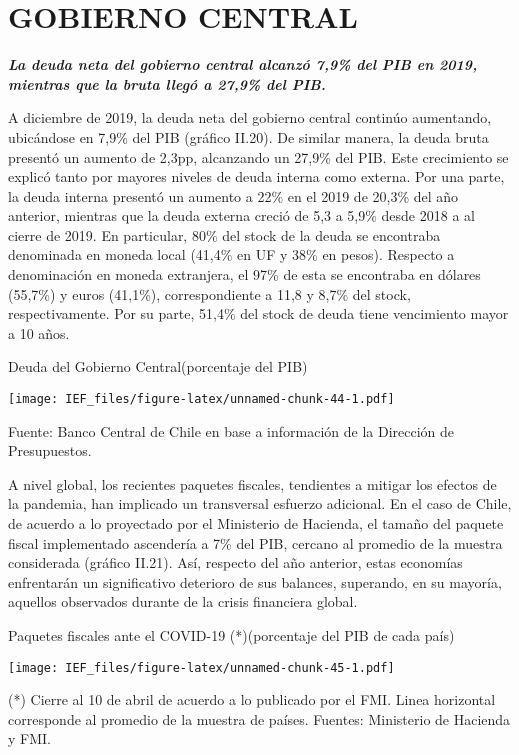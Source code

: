 \documentclass[
]{book}
\begin{document}
\hypertarget{GOC}{%
\section*{GOBIERNO CENTRAL}\label{GOC}}

\textbf{\emph{La deuda neta del gobierno central alcanzó 7,9\% del PIB en 2019,
mientras que la bruta llegó a 27,9\% del PIB.}}

A diciembre de 2019, la deuda neta del gobierno central continúo aumentando,
ubicándose en 7,9\% del PIB (gráfico II.20). De similar manera, la deuda bruta
presentó un aumento de 2,3pp, alcanzando un 27,9\% del PIB. Este crecimiento
se explicó tanto por mayores niveles de deuda interna como externa. Por una
parte, la deuda interna presentó un aumento a 22\% en el 2019 de 20,3\% del
año anterior, mientras que la deuda externa creció de 5,3 a 5,9\% desde 2018
a al cierre de 2019. En particular, 80\% del stock de la deuda se encontraba
denominada en moneda local (41,4\% en UF y 38\% en pesos). Respecto a
denominación en moneda extranjera, el 97\% de esta se encontraba en
dólares (55,7\%) y euros (41,1\%), correspondiente a 11,8 y 8,7\% del stock,
respectivamente. Por su parte, 51,4\% del stock de deuda tiene vencimiento
mayor a 10 años.

Deuda del Gobierno Central(porcentaje del PIB)

\texttt{[image: IEF\_files/figure-latex/unnamed-chunk-44-1.pdf]}

Fuente: Banco Central de Chile en base a información de la Dirección de Presupuestos.

A nivel global, los recientes paquetes fiscales, tendientes a mitigar los efectos
de la pandemia, han implicado un transversal esfuerzo adicional. En el caso de
Chile, de acuerdo a lo proyectado por el Ministerio de Hacienda, el tamaño del
paquete fiscal implementado ascendería a 7\% del PIB, cercano al promedio
de la muestra considerada (gráfico II.21). Así, respecto del año anterior, estas
economías enfrentarán un significativo deterioro de sus balances, superando,
en su mayoría, aquellos observados durante de la crisis financiera global.

Paquetes fiscales ante el COVID-19 (*)(porcentaje del PIB de cada país)

\texttt{[image: IEF\_files/figure-latex/unnamed-chunk-45-1.pdf]}

(*) Cierre al 10 de abril de acuerdo a lo publicado por el FMI. Linea horizontal corresponde al promedio de la muestra de países.
Fuentes: Ministerio de Hacienda y FMI.
\end{document}
